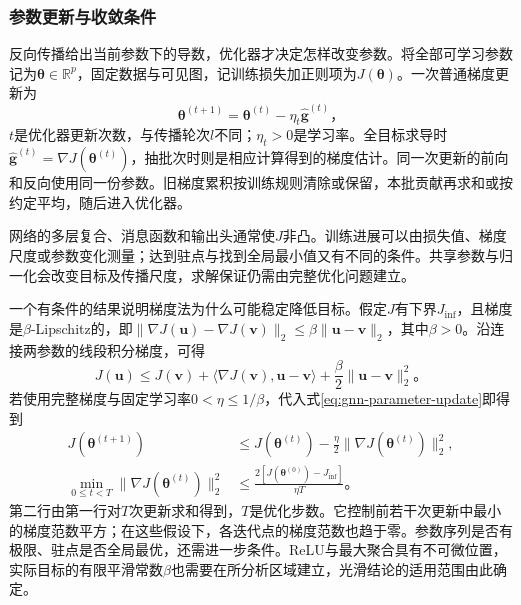 \subsubsection{参数更新与收敛条件}
\label{sec:gnn-optimization-convergence}

反向传播给出当前参数下的导数，优化器才决定怎样改变参数。将全部可学习参数记为$\bm{\theta}\in\mathbb{R}^{p}$，固定数据与可见图，记训练损失加正则项为$J(\bm{\theta})$。一次普通梯度更新为
\begin{equation}
  \bm{\theta}^{(t+1)}=\bm{\theta}^{(t)}
    -\eta_t\widehat{\bm{g}}^{(t)}\text{，}
  \label{eq:gnn-parameter-update}
\end{equation}
$t$是优化器更新次数，与传播轮次$l$不同；$\eta_t>0$是学习率。全目标求导时$\widehat{\bm{g}}^{(t)}=\nabla J(\bm{\theta}^{(t)})$，抽批次时则是相应计算得到的梯度估计。同一次更新的前向和反向使用同一份参数。旧梯度累积按训练规则清除或保留，本批贡献再求和或按约定平均，随后进入优化器。

网络的多层复合、消息函数和输出头通常使$J$非凸。训练进展可以由损失值、梯度尺度或参数变化测量；达到驻点与找到全局最小值又有不同的条件。共享参数与归一化会改变目标及传播尺度，求解保证仍需由完整优化问题建立。

一个有条件的结果说明梯度法为什么可能稳定降低目标。假定$J$有下界$J_{\inf}$，且梯度是$\beta$-Lipschitz的，即$\lVert\nabla J(\bm{u})-\nabla J(\bm{v})\rVert_2\leq\beta\lVert\bm{u}-\bm{v}\rVert_2$，其中$\beta>0$。沿连接两参数的线段积分梯度，可得
\[
  J(\bm{u})\leq J(\bm{v})+
  \langle\nabla J(\bm{v}),\bm{u}-\bm{v}\rangle
  +\frac{\beta}{2}\lVert\bm{u}-\bm{v}\rVert_2^2\text{。}
\]
若使用完整梯度与固定学习率$0<\eta\leq1/\beta$，代入式\eqref{eq:gnn-parameter-update}即得到
\begin{equation}
  \begin{aligned}
    J(\bm{\theta}^{(t+1)})
      &\leq J(\bm{\theta}^{(t)})
        -\frac{\eta}{2}\lVert\nabla J(\bm{\theta}^{(t)})\rVert_2^2,\\
    \min_{0\leq t<T}\lVert\nabla J(\bm{\theta}^{(t)})\rVert_2^2
      &\leq\frac{2[J(\bm{\theta}^{(0)})-J_{\inf}]}{\eta T}\text{。}
  \end{aligned}
  \label{eq:gnn-gradient-descent-bound}
\end{equation}
第二行由第一行对$T$次更新求和得到，$T$是优化步数。它控制前若干次更新中最小的梯度范数平方；在这些假设下，各迭代点的梯度范数也趋于零。参数序列是否有极限、驻点是否全局最优，还需进一步条件。ReLU与最大聚合具有不可微位置，实际目标的有限平滑常数$\beta$也需要在所分析区域建立，光滑结论的适用范围由此确定。


